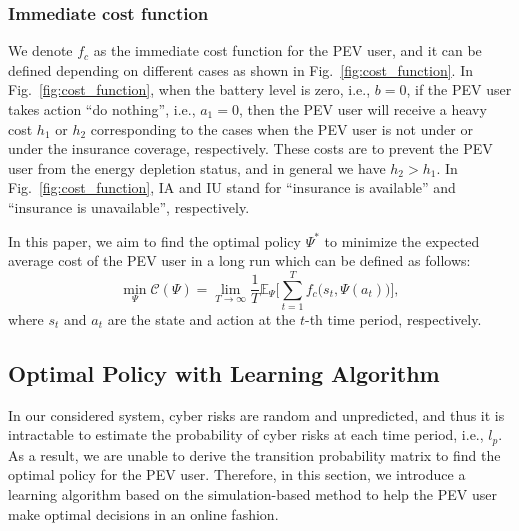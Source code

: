 \documentclass[twocolumn,10pt]{IEEEtran}
\begin{document}
\subsubsection{Immediate cost function}

We denote $f_c$ as the immediate cost function for the PEV user, and it can be defined depending on different cases as shown in Fig.~\ref{fig:cost_function}. In Fig.~\ref{fig:cost_function}, when the battery level is zero, i.e., $b=0$, if the PEV user takes action ``do nothing'', i.e., $a_1=0$, then the PEV user will receive a heavy cost $h_1$ or $h_2$ corresponding to the cases when the PEV user is not under or under the insurance coverage, respectively. These costs are to prevent the PEV user from the energy depletion status, and in general we have $h_2>h_1$. In Fig.~\ref{fig:cost_function}, IA and IU stand for ``insurance is available'' and ``insurance is unavailable'', respectively. 

In this paper, we aim to find the optimal policy $\Psi^*$ to minimize the expected average cost of the PEV user in a long run which can be defined as follows:
\begin{equation}
\min_{\Psi} 	\mathcal{C} (\Psi) = \lim_{T \rightarrow \infty}  \frac{1}{T} \mathbb{E}_{\Psi} \Bigg[ \sum_{t=1}^{T} f_c \Big(s_t,\Psi(a_t)	\Big)	\Bigg],
\end{equation}
where $s_t$ and $a_t$ are the state and action at the $t$-th time period, respectively.


\subsection{Optimal Policy with Learning Algorithm}

In our considered system, cyber risks are random and unpredicted, and thus it is intractable to estimate the probability of cyber risks at each time period, i.e., $l_p$. As a result, we are unable to derive the transition probability matrix to find the optimal policy for the PEV user. Therefore, in this section, we introduce a learning algorithm based on the simulation-based method to help the PEV user make optimal decisions in an online fashion. %

\end{document}
